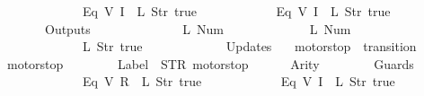 \begin{isabellebody}
\ \ \ \ \ \ \ \ \ \ \ \ {\isacharparenleft}Eq\ {\isacharparenleft}V\ {\isacharparenleft}I\ {}{\isacharparenright}{\isacharparenright}\ {\isacharparenleft}L\ {\isacharparenleft}Str\ {\isacharprime}{\isacharprime}true{\isacharprime}{\isacharprime}{\isacharparenright}{\isacharparenright}{\isacharparenright}{\isacharcomma}\isanewline
\ \ \ \ \ \ \ \ \ \ \ \ {\isacharparenleft}Eq\ {\isacharparenleft}V\ {\isacharparenleft}I\ {}{\isacharparenright}{\isacharparenright}\ {\isacharparenleft}L\ {\isacharparenleft}Str\ {\isacharprime}{\isacharprime}true{\isacharprime}{\isacharprime}{\isacharparenright}{\isacharparenright}{\isacharparenright}\isanewline
\ \ \ \ \ \ {\isacharbrackright}{\isacharcomma}\isanewline
\ \ \ \ \ \ Outputs\ {\isacharequal}\ {\isacharbrackleft}\isanewline
\ \ \ \ \ \ \ \ \ \ \ \ {\isacharparenleft}L\ {\isacharparenleft}Num\ {}{\isacharparenright}{\isacharparenright}{\isacharcomma}\isanewline
\ \ \ \ \ \ \ \ \ \ \ \ {\isacharparenleft}L\ {\isacharparenleft}Num\ {}{\isacharparenright}{\isacharparenright}{\isacharcomma}\isanewline
\ \ \ \ \ \ \ \ \ \ \ \ {\isacharparenleft}L\ {\isacharparenleft}Str\ {\isacharprime}{\isacharprime}true{\isacharprime}{\isacharprime}{\isacharparenright}{\isacharparenright}\isanewline
\ \ \ \ \ \ {\isacharbrackright}{\isacharcomma}\isanewline
\ \ \ \ \ \ Updates\ {\isacharequal}\ {\isacharbrackleft}{\isacharbrackright}\isanewline
{\isasymrparr}{\isachardoublequoteclose}\isanewline
\isanewline
{}\isamarkupfalse%
\ {\isachardoublequoteopen}motorstop{}{\isachardoublequoteclose}\ {\isacharcolon}{\isacharcolon}\ {\isachardoublequoteopen}transition{\isachardoublequoteclose}\ \isanewline
{\isachardoublequoteopen}motorstop{}\ {\isasymequiv}\ {\isasymlparr}\isanewline
\ \ \ \ \ \ Label\ {\isacharequal}\ STR\ {\isacharprime}{\isacharprime}motorstop{\isacharprime}{\isacharprime}{\isacharcomma}\isanewline
\ \ \ \ \ \ Arity\ {\isacharequal}\ {}{\isacharcomma}\isanewline
\ \ \ \ \ \ Guards\ {\isacharequal}\ {\isacharbrackleft}\isanewline
\ \ \ \ \ \ \ \ \ \ \ \ {\isacharparenleft}Eq\ {\isacharparenleft}V\ {\isacharparenleft}R\ {}{\isacharparenright}{\isacharparenright}\ {\isacharparenleft}L\ {\isacharparenleft}Str\ {\isacharprime}{\isacharprime}true{\isacharprime}{\isacharprime}{\isacharparenright}{\isacharparenright}{\isacharparenright}{\isacharcomma}\isanewline
\ \ \ \ \ \ \ \ \ \ \ \ {\isacharparenleft}Eq\ {\isacharparenleft}V\ {\isacharparenleft}I\ {}{\isacharparenright}{\isacharparenright}\ {\isacharparenleft}L\ {\isacharparenleft}Str\ {\isacharprime}{\isacharprime}true{\isacharprime}{\isacharprime}{\isacharparenright}{\isacharparenright}{\isacharparenright}{\isacharcomma}\isanewline

\end{isabellebody}
